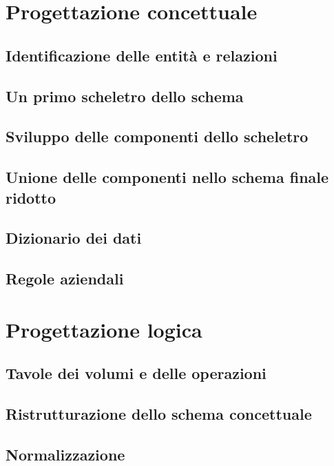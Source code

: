 \documentclass{article}
\begin{document}
\section{Progettazione concettuale}

\subsection{Identificazione delle entità e relazioni}

\subsection{Un primo scheletro dello schema}

\subsection{Sviluppo delle componenti dello scheletro}

\subsection{Unione delle componenti nello schema finale ridotto}

\subsection{Dizionario dei dati}

\subsection{Regole aziendali}

\section{Progettazione logica}

\subsection{Tavole dei volumi e delle operazioni}

\subsection{Ristrutturazione dello schema concettuale}

\subsection{Normalizzazione}
\end{document}
